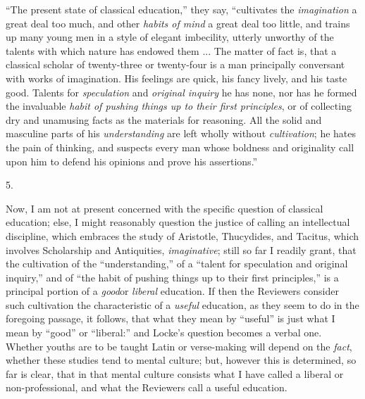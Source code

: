 ``The present state of classical education,'' they say,
``cultivates the \emph{imagination} a great deal too much, and
other \emph{habits of mind} a great deal too little, and trains up
many young men in a style of elegant imbecility, utterly unworthy of
the talents with which nature has endowed them ... The matter of fact
is, that a classical scholar of twenty-three or twenty-four is a man
principally conversant with works of imagination. His feelings are
quick, his fancy lively, and his taste good. Talents for \emph{speculation}
and \emph{original inquiry} he has none, nor has he formed the
invaluable \emph{habit of pushing things up to their first principles},
or of collecting dry and unamusing facts as the materials for
reasoning. All the solid and masculine parts of his \emph{understanding}
are left wholly without \emph{cultivation}; he hates the pain of
thinking, and suspects every man whose boldness and originality call upon him to defend his opinions and prove his assertions.''

5.

Now, I am not at present concerned with the specific question of
classical education; else, I might reasonably question the justice of
calling an intellectual discipline, which embraces the study of
Aristotle, Thucydides, and Tacitus, which involves Scholarship and
Antiquities, \emph{imaginative}; still so far I readily grant, that
the cultivation of the ``understanding,'' of a ``talent
for speculation and original inquiry,'' and of ``the habit of
pushing things up to their first principles,'' is a principal
portion of a \emph{good}or \emph{liberal} education. If then the
Reviewers consider such cultivation the characteristic of a \emph{useful}
education, as they seem to do in the foregoing passage, it follows,
that what they mean by ``useful'' is just what I mean by
``good'' or ``liberal:'' and Locke's question becomes
a verbal one. Whether youths are to be taught Latin or verse-making
will depend on the \emph{fact}, whether these studies tend to mental
culture; but, however this is determined, so far is clear, that in
that mental culture consists what I have called a liberal or
non-professional, and what the Reviewers call a useful education.


